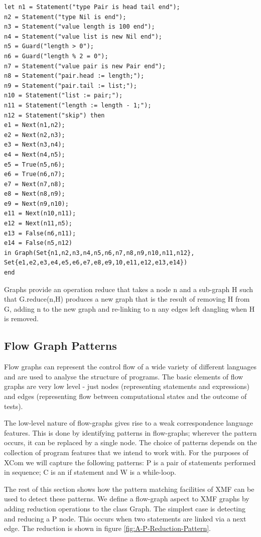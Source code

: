 \begin{lstlisting}
let n1 = Statement("type Pair is head tail end");
n2 = Statement("type Nil is end");
n3 = Statement("value length is 100 end");
n4 = Statement("value list is new Nil end");
n5 = Guard("length > 0");
n6 = Guard("length % 2 = 0");
n7 = Statement("value pair is new Pair end");
n8 = Statement("pair.head := length;");
n9 = Statement("pair.tail := list;");
n10 = Statement("list := pair;");
n11 = Statement("length := length - 1;");
n12 = Statement("skip") then
e1 = Next(n1,n2);
e2 = Next(n2,n3);
e3 = Next(n3,n4);
e4 = Next(n4,n5);
e5 = True(n5,n6);
e6 = True(n6,n7);
e7 = Next(n7,n8);
e8 = Next(n8,n9);
e9 = Next(n9,n10);
e11 = Next(n10,n11);
e12 = Next(n11,n5);
e13 = False(n6,n11);
e14 = False(n5,n12)
in Graph(Set{n1,n2,n3,n4,n5,n6,n7,n8,n9,n10,n11,n12},
Set{e1,e2,e3,e4,e5,e6,e7,e8,e9,10,e11,e12,e13,e14})
end
\end{lstlisting}Graphs provide an operation reduce that takes
a node n and a sub-graph 
H such that G.reduce(n,H) produces a new
graph that is the result of removing H from
G, adding  n to the new
graph and re-linking to n any edges left dangling
when H is removed.


\subsection{Flow Graph Patterns}

Flow graphs can represent the control flow of a wide variety of different
languages and are used to analyse the structure of programs. The basic
elements of flow graphs are very low level - just nodes (representing
statements and expressions) and edges (representing flow between computational
states and the outcome of tests).

The low-level nature of flow-graphs gives rise to a weak correspondence
language features. This is done by identifying patterns in flow-graphs;
wherever the pattern occurs, it can be replaced by a single node.
The choice of patterns depends on the collection of program features
that we intend to work with. For the purposes of XCom we will capture
the following patterns: P is a pair of statements
performed in sequence; C is an if statement
and  W is a while-loop. 

The rest of this section shows how the pattern matching facilities
of XMF can be used to detect these patterns. We define a flow-graph
aspect to XMF graphs by adding reduction operations
to the class Graph. The simplest case is detecting
and reducing a P node. This occurs when two
statements are linked via a next edge. The
reduction is shown in figure \ref{fig:A-P-Reduction-Pattern}.

